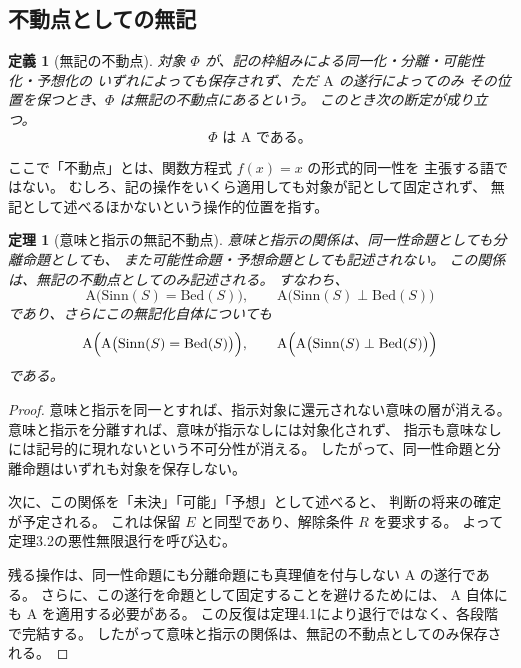 \documentclass[11pt,a4paper,ja=standard,lualatex]{bxjsarticle}
\newtheorem{theorem}{定理}
\newtheorem{definition}{定義}
\begin{document}
\subsection{不動点としての無記}

\begin{definition}[無記の不動点]
対象 $\Phi$ が、記の枠組みによる同一化・分離・可能性化・予想化の
いずれによっても保存されず、ただ $\mathrm{A}$ の遂行によってのみ
その位置を保つとき、$\Phi$ は無記の不動点にあるという。
このとき次の断定が成り立つ。
\begin{equation}
\Phi\text{ は }\mathrm{A}\text{ である。}
\end{equation}
\end{definition}

ここで「不動点」とは、関数方程式 $f(x)=x$ の形式的同一性を
主張する語ではない。
むしろ、記の操作をいくら適用しても対象が記として固定されず、
無記として述べるほかないという操作的位置を指す。

\begin{theorem}[意味と指示の無記不動点]
意味と指示の関係は、同一性命題としても分離命題としても、
また可能性命題・予想命題としても記述されない。
この関係は、無記の不動点としてのみ記述される。
すなわち、
\begin{equation}
\mathrm{A}\bigl(\mathrm{Sinn}(S)=\mathrm{Bed}(S)\bigr),
\qquad
\mathrm{A}\bigl(\mathrm{Sinn}(S)\perp\mathrm{Bed}(S)\bigr)
\end{equation}
であり、さらにこの無記化自体についても
\begin{equation}
\mathrm{A}\Bigl(\mathrm{A}\bigl(\mathrm{Sinn}(S)=\mathrm{Bed}(S)\bigr)\Bigr),
\qquad
\mathrm{A}\Bigl(\mathrm{A}\bigl(\mathrm{Sinn}(S)\perp\mathrm{Bed}(S)\bigr)\Bigr)
\end{equation}
である。
\end{theorem}

\begin{proof}
意味と指示を同一とすれば、指示対象に還元されない意味の層が消える。
意味と指示を分離すれば、意味が指示なしには対象化されず、
指示も意味なしには記号的に現れないという不可分性が消える。
したがって、同一性命題と分離命題はいずれも対象を保存しない。

次に、この関係を「未決」「可能」「予想」として述べると、
判断の将来の確定が予定される。
これは保留 $E$ と同型であり、解除条件 $R$ を要求する。
よって定理3.2の悪性無限退行を呼び込む。

残る操作は、同一性命題にも分離命題にも真理値を付与しない
$\mathrm{A}$ の遂行である。
さらに、この遂行を命題として固定することを避けるためには、
$\mathrm{A}$ 自体にも $\mathrm{A}$ を適用する必要がある。
この反復は定理4.1により退行ではなく、各段階で完結する。
したがって意味と指示の関係は、無記の不動点としてのみ保存される。
\end{proof}
\end{document}
